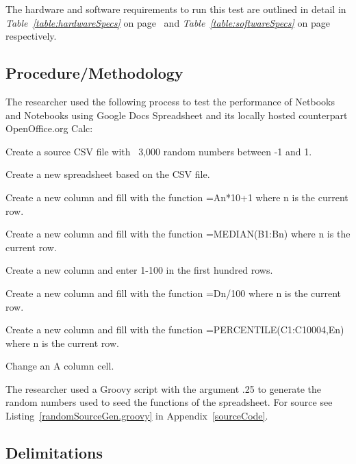 The hardware and software requirements to run this test are outlined in detail
in \emph{Table~\ref{table:hardwareSpecs}} on page~\pageref{table:hardwareSpecs}
and \emph{Table~\ref{table:softwareSpecs}} on page~\pageref{table:softwareSpecs}
respectively.





\subsection{Procedure/Methodology}

\label{sec:proc}

The researcher used the following process to test the performance of Netbooks
and Notebooks using Google Docs Spreadsheet and its locally hosted counterpart
OpenOffice.org Calc:

\begin{compactenum}
\item Create a source CSV file with ~3,000 random numbers between -1 and
  1.  \label{item:proc1}
\item Create a new spreadsheet based on the CSV file.  \label{item:proc2}
\item Create a new column and fill with the function =An*10+1 where n is the
  current row.  \label{item:proc3}
\item Create a new column and fill with the function =MEDIAN(B1:Bn) where n is
  the current row.  \label{item:proc4}
\item Create a new column and enter 1-100 in the first hundred
  rows.  \label{item:proc5}
\item Create a new column and fill with the function =Dn/100 where n is the
  current row.  \label{item:proc6}
\item Create a new column and fill with the function =PERCENTILE(C1:C10004,En)
  where n is the current row.  \label{item:proc7}
\item Change an A column cell.  \label{item:proc8}
\end{compactenum}

The researcher used a Groovy script with the argument .25 to generate the random
numbers used to seed the functions of the spreadsheet.  For source see
Listing~\ref{randomSourceGen.groovy} in Appendix~\ref{sourceCode}.

\subsection{Delimitations}

